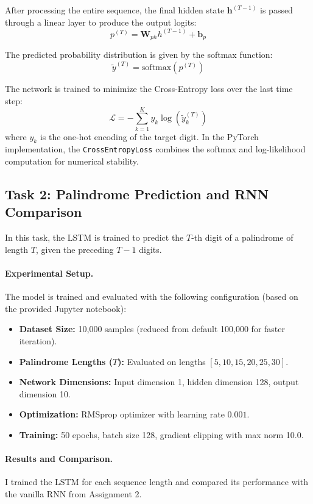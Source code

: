 \documentclass[11pt,a4paper]{article}
\begin{document}
After processing the entire sequence, the final hidden state $\mathbf{h}^{(T-1)}$ is passed through a linear layer to produce the output logits:
\[ p^{(T)} = \mathbf{W}_{ph}h^{(T-1)} + \mathbf{b}_p \]

The predicted probability distribution is given by the softmax function:
\[ \tilde{y}^{(T)} = \text{softmax}(p^{(T)}) \]

The network is trained to minimize the Cross-Entropy loss over the last time step:
\[ \mathcal{L} = -\sum_{k=1}^{K} y_k \log(\tilde{y}_k^{(T)}) \]
where $y_k$ is the one-hot encoding of the target digit. In the PyTorch implementation, the \texttt{CrossEntropyLoss} combines the softmax and log-likelihood computation for numerical stability.

\subsection{Task 2: Palindrome Prediction and RNN Comparison}
In this task, the LSTM is trained to predict the $T$-th digit of a palindrome of length $T$, given the preceding $T-1$ digits.

\paragraph{Experimental Setup.}
The model is trained and evaluated with the following configuration (based on the provided Jupyter notebook):
\begin{itemize}
    \item \textbf{Dataset Size:} 10,000 samples (reduced from default 100,000 for faster iteration).
    \item \textbf{Palindrome Lengths ($T$):} Evaluated on lengths $[5, 10, 15, 20, 25, 30]$.
    \item \textbf{Network Dimensions:} Input dimension 1, hidden dimension 128, output dimension 10.
    \item \textbf{Optimization:} RMSprop optimizer with learning rate $0.001$.
    \item \textbf{Training:} 50 epochs, batch size 128, gradient clipping with max norm 10.0.
\end{itemize}

\paragraph{Results and Comparison.}
I trained the LSTM for each sequence length and compared its performance with the vanilla RNN from Assignment 2.
\end{document}
